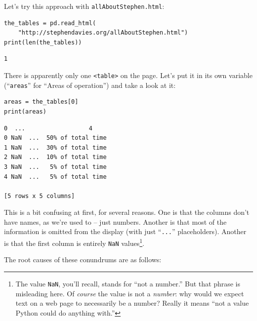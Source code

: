 
Let's try this approach with \texttt{allAboutStephen.html}:

\begin{Verbatim}[fontsize=\small,samepage=true,frame=single,framesep=3mm]
the_tables = pd.read_html(
    "http://stephendavies.org/allAboutStephen.html")
print(len(the_tables))
\end{Verbatim}
\vspace{-.2in}

\begin{Verbatim}[fontsize=\small,samepage=true,frame=leftline,framesep=5mm,framerule=1mm]
1
\end{Verbatim}

There is apparently only one \texttt{<table>} on the page. Let's put it in its
own variable (``\texttt{areas}'' for ``Areas of operation'') and take a look at
it:

\begin{Verbatim}[fontsize=\small,samepage=true,frame=single,framesep=3mm]
areas = the_tables[0]
print(areas)
\end{Verbatim}
\vspace{-.2in}

\begin{Verbatim}[fontsize=\small,samepage=true,frame=leftline,framesep=5mm,framerule=1mm]
    0  ...                  4
0 NaN  ...  50% of total time
1 NaN  ...  30% of total time
2 NaN  ...  10% of total time
3 NaN  ...   5% of total time
4 NaN  ...   5% of total time

[5 rows x 5 columns]
\end{Verbatim}


This is a bit confusing at first, for several reasons. One is that the columns
don't have names, as we're used to -- just numbers. Another is that most of the
information is omitted from the display (with just ``\texttt{...}''
placeholders). Another is that the first column is entirely \texttt{NaN}
values\footnote{The value \texttt{NaN}, you'll recall, stands for ``not a
number.'' But that phrase is misleading here. Of \textit{course} the value is
not a \textit{number}: why would we expect text on a web page to necessarily be
a number? Really it means ``not a value Python could do anything with.''}.

\pagebreak
The root causes of these conundrums are as follows:

